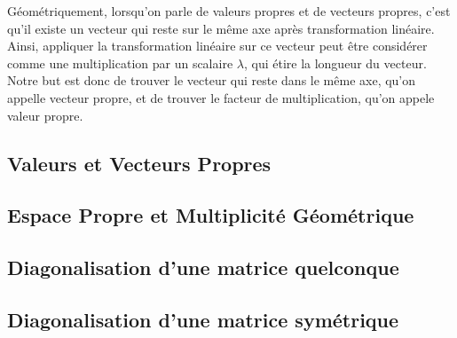 \documentclass{article}
\begin{document}
Géométriquement, lorsqu'on parle de valeurs propres et de vecteurs propres, c'est
qu'il existe un vecteur qui reste sur le même axe après transformation linéaire.
Ainsi, appliquer la transformation linéaire sur ce vecteur peut être considérer
comme une multiplication par un scalaire $\lambda$, qui étire la longueur du vecteur.
Notre but est donc de trouver le vecteur qui reste dans le même axe, qu'on appelle
vecteur propre, et de trouver le facteur de multiplication, qu'on appele valeur
propre.

\subsection{Valeurs et Vecteurs Propres}
\subsection{Espace Propre et Multiplicité Géométrique}
\subsection{Diagonalisation d'une matrice quelconque}
\subsection{Diagonalisation d'une matrice symétrique}

\pagebreak
\end{document}
